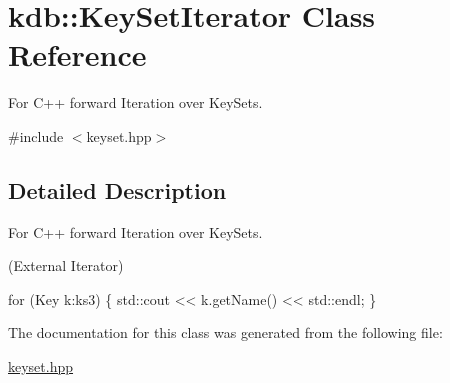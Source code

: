 \hypertarget{classkdb_1_1KeySetIterator}{\section{kdb\+:\+:Key\+Set\+Iterator Class Reference}
\label{classkdb_1_1KeySetIterator}
}


For C++ forward Iteration over Key\+Sets.  




{\ttfamily \#include $<$keyset.\+hpp$>$}



\subsection{Detailed Description}
For C++ forward Iteration over Key\+Sets. 

(External Iterator) 
\begin{DoxyCode}
\textcolor{keywordflow}{for} (Key k:ks3)
\{
   std::cout << k.getName() << std::endl;
\}
\end{DoxyCode}
 

The documentation for this class was generated from the following file\+:\begin{DoxyCompactItemize}
\item 
\hyperlink{keyset_8hpp}{keyset.\+hpp}\end{DoxyCompactItemize}
